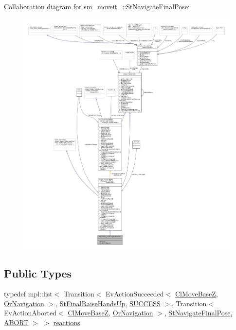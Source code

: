 Collaboration diagram for sm\+\_\+moveit\+\_\+:\+:St\+Navigate\+Final\+Pose\+:
\nopagebreak
\begin{figure}[H]
\begin{center}
\leavevmode
\includegraphics[width=350pt]{structsm__moveit__4_1_1StNavigateFinalPose__coll__graph}
\end{center}
\end{figure}
\subsection*{Public Types}
\begin{DoxyCompactItemize}
\item 
typedef mpl\+::list$<$ Transition$<$ Ev\+Action\+Succeeded$<$ \hyperlink{classcl__move__base__z_1_1ClMoveBaseZ}{Cl\+Move\+BaseZ}, \hyperlink{classsm__moveit__4_1_1OrNavigation}{Or\+Navigation} $>$, \hyperlink{structsm__moveit__4_1_1StFinalRaiseHandsUp}{St\+Final\+Raise\+Hands\+Up}, \hyperlink{classSUCCESS}{S\+U\+C\+C\+E\+SS} $>$, Transition$<$ Ev\+Action\+Aborted$<$ \hyperlink{classcl__move__base__z_1_1ClMoveBaseZ}{Cl\+Move\+BaseZ}, \hyperlink{classsm__moveit__4_1_1OrNavigation}{Or\+Navigation} $>$, \hyperlink{structsm__moveit__4_1_1StNavigateFinalPose}{St\+Navigate\+Final\+Pose}, \hyperlink{classABORT}{A\+B\+O\+RT} $>$ $>$ \hyperlink{structsm__moveit__4_1_1StNavigateFinalPose_a4b58294d4af366f631ae201681a57093}{reactions}
\end{DoxyCompactItemize}
